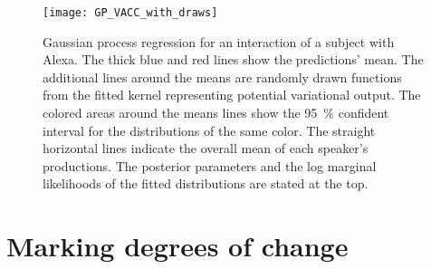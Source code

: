%
\begin{figure}[t]
	\centering
	\texttt{[image: GP\_VACC\_with\_draws]}
	\caption[Gaussian process regression on a conversation with Alexa]
		{Gaussian process regression for an interaction of a subject with Alexa.
		 The thick blue and red lines show the predictions' mean.
		 The additional lines around the means are randomly drawn functions from the fitted kernel representing potential variational output.
		 The colored areas around the means lines show the \SI{95}{\percent} confident interval for the distributions of the same color.
		 The straight horizontal lines indicate the overall mean of each speaker's productions.
		 The posterior parameters and the log marginal likelihoods of the fitted distributions are stated at the top.}
	\label{fig:gp_vacc}
\end{figure}

\section{Marking degrees of change}
\label{sec:measuring_changes}

